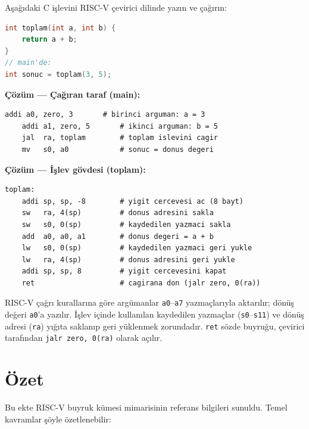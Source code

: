 \begin{ornek}[C.4]
\label{orn:ekc-altyordam}
Aşağıdaki C işlevini RISC-V çevirici dilinde yazın ve çağırın:
\begin{lstlisting}[language=C]
int toplam(int a, int b) {
    return a + b;
}
// main'de:
int sonuc = toplam(3, 5);
\end{lstlisting}

\textbf{Çözüm --- Çağıran taraf (main):}
\begin{lstlisting}[style=riscv]
    addi a0, zero, 3       # birinci arguman: a = 3
    addi a1, zero, 5       # ikinci arguman: b = 5
    jal  ra, toplam        # toplam islevini cagir
    mv   s0, a0            # sonuc = donus degeri
\end{lstlisting}

\textbf{Çözüm --- İşlev gövdesi (toplam):}
\begin{lstlisting}[style=riscv]
toplam:
    addi sp, sp, -8        # yigit cercevesi ac (8 bayt)
    sw   ra, 4(sp)         # donus adresini sakla
    sw   s0, 0(sp)         # kaydedilen yazmaci sakla
    add  a0, a0, a1        # donus degeri = a + b
    lw   s0, 0(sp)         # kaydedilen yazmaci geri yukle
    lw   ra, 4(sp)         # donus adresini geri yukle
    addi sp, sp, 8         # yigit cercevesini kapat
    ret                    # cagirana don (jalr zero, 0(ra))
\end{lstlisting}

RISC-V çağrı kurallarına göre argümanlar \texttt{a0}--\texttt{a7} yazmaçlarıyla aktarılır; dönüş değeri \texttt{a0}'a yazılır. İşlev içinde kullanılan kaydedilen yazmaçlar (\texttt{s0}--\texttt{s11}) ve dönüş adresi (\texttt{ra}) yığıta saklanıp geri yüklenmek zorundadır. \texttt{ret} sözde buyruğu, çevirici tarafından \texttt{jalr zero, 0(ra)} olarak açılır.
\end{ornek}

\section*{Özet}

Bu ekte RISC-V buyruk kümesi mimarisinin referans bilgileri sunuldu. Temel kavramlar şöyle özetlenebilir:


